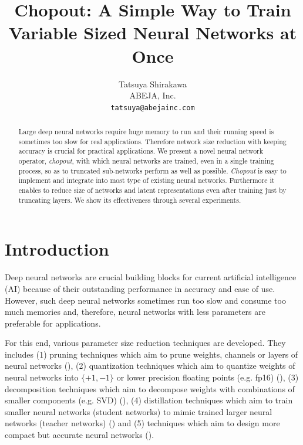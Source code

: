 \documentclass{article}
\title{Chopout: A Simple Way to Train Variable Sized Neural Networks at Once}
\author{
      Tatsuya Shirakawa \\
      ABEJA, Inc. \\
      \texttt{tatsuya@abejainc.com}
    }
\begin{document}
    
    \maketitle
    
    \begin{abstract}
      Large deep neural networks require huge memory to run and their running speed is sometimes too slow for real applications. Therefore network size reduction with keeping accuracy is crucial for practical applications. We present a novel neural network operator, \textit{chopout}, with which neural networks are trained, even in a single training process, so as to truncated sub-networks perform as well as possible. \textit{Chopout} is easy to implement and integrate into most type of existing neural networks. Furthermore it enables to reduce size of networks and latent representations even after training just by truncating layers. We show its effectiveness through several experiments.
    \end{abstract}
    
    \section{Introduction}
    
    Deep neural networks are crucial building blocks for current artificial intelligence (AI)  because of their outstanding performance in accuracy and ease of use. However, such deep neural networks sometimes run too slow and consume too much memories and, therefore, neural networks with less parameters are preferable for applications.
    
    For this end, various parameter size reduction techniques are developed. They includes 
    (1) pruning techniques which aim to prune weights, channels or layers of neural networks (\citet{han2015deep, aghasi2017nettrim, dong2017learning, molchanov2016pruning, li2017pruning, luo2017thinet, ye2018rethinking, liu2017learning, he2017channel}), 
    (2) quantization techniques which aim to quantize weights of neural networks into $\{+1, -1\}$ or lower precision floating points (e.g. fp16) (\citet{han2015learning, courbariaux2015binaryconnect, rastegari2016xnor, zhou2016dorefa, zhu2016trained,  wu2016quantized, hubara2017quantized}), 
    (3) decomposition techniques which aim to decompose weights with combinations of smaller components (e.g. SVD) (\citet{denton2014exploiting, jaderberg2014speeding, lebedev2014speeding, yang2015deep, novikov2015tensorizing}), 
    (4) distillation techniques which aim to train smaller neural networks (student networks) to mimic trained larger neural networks (teacher networks) (\citet{hinton2015distilling, mishra2017apprentice, polino2018model}) and 
    (5) techniques which aim to design more compact but accurate neural networks (\citet{iandola2016squeezenet, howard2017mobilenet, sandler2018mobilenetv2, zhang2017shufflenet}).
\end{document}
